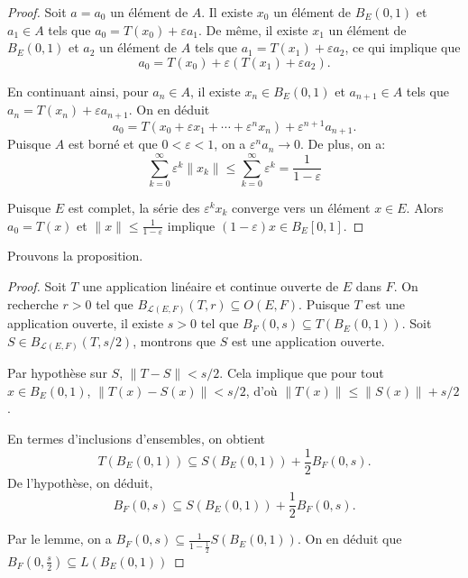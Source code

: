 \begin{proof}
  Soit $a = a_0$ un élément de $A$. Il existe $x_0$ un élément
  de $B_E(0, 1)$ et $a_1\in A$ tels que $a_0 = T(x_0) + \varepsilon a_1$.
  De même, il existe $x_1$ un élément de $B_E(0, 1)$ et $a_2$ un élément
  de $A$ tels que $a_1 = T(x_1) + \varepsilon a_2$, ce qui implique
  que
  $$a_0 = T(x_0) + \varepsilon (T(x_1) +\varepsilon a_2).$$

  En continuant ainsi, pour $a_n\in A$, il existe $x_n\in B_E(0, 1)$
  et $a_{n+1}\in A$ tels que $a_n = T(x_n) + \varepsilon a_{n+1}$. On en déduit
  $$a_0 = T(x_0 + \varepsilon x_1 + \cdots + \varepsilon^nx_n)+%
  \varepsilon^{n+1}a_{n+1}.$$
  Puisque $A$ est borné et que $0 < \varepsilon < 1$, on a
  $\varepsilon^na_n \to 0$. De plus, on a:
  $$\sum_{k=0}^{\infty}\varepsilon^k\|x_k\| \leq%
  \sum_{k=0}^{\infty}\varepsilon^k = \frac{1}{1-\varepsilon}$$

  Puisque $E$ est complet, la série des $\varepsilon^kx_k$ converge
  vers un élément $x\in E$. Alors $a_0 = T(x)$ et $\|x\|\leq
  \frac{1}{1-\varepsilon}$ implique $(1-\varepsilon)x \in B_E[0, 1]$.
\end{proof}
Prouvons la proposition.
\begin{proof}
  Soit $T$ une application linéaire et continue ouverte de $E$ dans $F$.
  On recherche $r>0$ tel que $B_{\mathscr L(E, F)}(T, r)\subseteq O(E, F)$.
  Puisque $T$ est une application ouverte, il existe $s>0$ tel que
  $B_F(0, s)\subseteq T(B_E(0, 1))$. Soit $S\in B_{\mathscr L(E, F)}(T, s/2)$,
  montrons que $S$ est une application ouverte.

  Par hypothèse sur $S$, $\|T-S\| < s/2$. Cela implique que pour tout
  $x\in B_E(0, 1)$, $\|T(x) - S(x)\|< s/2$, d'où $\|T(x)\|\leq \| S(x)\| + s/2$.

  En termes d'inclusions d'ensembles, on obtient
  $$T(B_E(0, 1)) \subseteq S(B_E(0, 1))+\frac{1}{2}B_F(0, s).$$
  De l'hypothèse, on déduit,
  $$B_F(0, s) \subseteq S(B_E(0, 1))+\frac{1}{2}B_F(0, s).$$

  Par le lemme, on a $B_F(0, s)\subseteq\frac{1}{1-\frac{1}{2}}S(B_E(0, 1))$.
  On en déduit que $B_F(0, \frac{s}{2})\subseteq L(B_E(0, 1))$
\end{proof}
